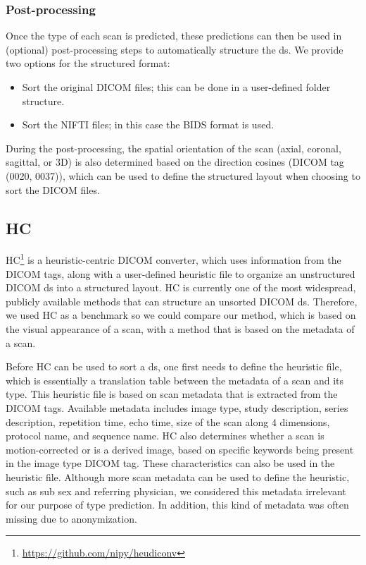 \subsubsection{Post-processing}

Once the \gls{type} of each \gls{scan} is predicted, these predictions can then be used in (optional) post-processing steps to automatically structure the \gls{ds}.
We provide two options for the structured format:

\begin{itemize}
    \itemsep0em
    \item Sort the original \gls{DICOM} files; this can be done in a user-defined folder structure.
    \item Sort the \gls{NIFTI} files; in this case the \gls{BIDS} format is used.
\end{itemize}

During the post-processing, the spatial orientation of the \gls{scan} (axial, coronal, sagittal, or 3D) is also determined based on the direction cosines (\gls{DICOM} tag (0020, 0037)), which can be used to define the structured layout when choosing to sort the \gls{DICOM} files.

\subsection{\acrlong{HC}}
\gls{HC}\footnote{\url{https://github.com/nipy/heudiconv}} is a heuristic-centric \gls{DICOM} converter, which uses information from the \gls{DICOM} tags, along with a user-defined heuristic file to organize an unstructured \gls{DICOM} \gls{ds} into a structured layout.
\gls{HC} is currently one of the most widespread, publicly available methods that can structure an unsorted \gls{DICOM} \gls{ds}.
Therefore, we used \gls{HC} as a benchmark so we could compare our method, which is based on the visual appearance of a \gls{scan}, with a method that is based on the metadata of a \gls{scan}.

Before \gls{HC} can be used to sort a \gls{ds}, one first needs to define the heuristic file, which is essentially a translation table between the metadata of a \gls{scan} and its \gls{type}.
This heuristic file is based on \gls{scan} metadata that is extracted from the \gls{DICOM} tags.
Available metadata includes image type, study description, series description, repetition time, echo time, size of the \gls{scan} along 4 dimensions, protocol name, and sequence name.
\gls{HC} also determines whether a \gls{scan} is motion-corrected or is a derived image, based on specific keywords being present in the image type \gls{DICOM} tag.
These characteristics can also be used in the heuristic file.
Although more \gls{scan} metadata can be used to define the heuristic, such as \gls{sub} sex and referring physician, we considered this metadata irrelevant for our purpose of \gls{type} prediction.
In addition, this kind of metadata was often missing due to anonymization.



